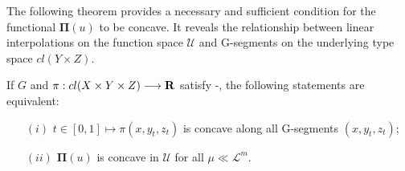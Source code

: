 The following theorem provides a necessary and sufficient condition for the functional $\pmb \Pi(u)$ to be concave. It reveals the relationship between linear interpolations on the function space $\mathcal{U}$ and G-segments on the underlying type space $cl( Y \times Z)$.\medskip

\begin{theorem}\label{maintheorem}
	If $G$ and $\pi: cl(X\times Y\times Z) \longrightarrow {\mathbf R}$ satisfy \Gzero-\Gfive, the following statements are equivalent:
	\begin{enumerate}[(i)]
	\item[$(i)$] $t\in[0,1] \longmapsto \pi(x, y_t ,z_t)$ is concave along all G-segments $(x, y_t, z_t)$;
	
	\item[$(ii)$] $\pmb \Pi(u)$ is concave in $\mathcal{U}$ for all $\mu\ll \mathcal{L}^m$. 
	\end{enumerate}
\end{theorem}

